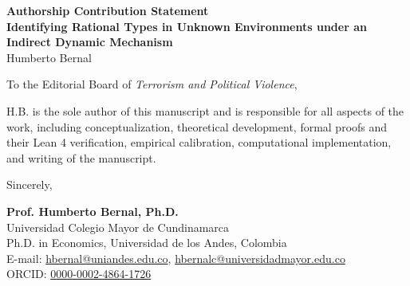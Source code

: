 \documentclass[12pt]{article}
\begin{document}
\singlespacing

\begin{center}
\textbf{Authorship Contribution Statement} \\
\vspace{1em}
\textbf{Identifying Rational Types in Unknown Environments under an Indirect Dynamic Mechanism} \\
Humberto Bernal
\end{center}

\vspace{3em}

\noindent To the Editorial Board of \textit{Terrorism and Political Violence},

\vspace{2em}

\noindent H.B. is the sole author of this manuscript and is responsible for all aspects of the work, including conceptualization, theoretical development, formal proofs and their Lean 4 verification, empirical calibration, computational implementation, and writing of the manuscript.

\vspace{4em}

\begin{flushleft}
Sincerely,

\vspace{3em}

\textbf{Prof. Humberto Bernal, Ph.D.} \\
Universidad Colegio Mayor de Cundinamarca \\
Ph.D. in Economics, Universidad de los Andes, Colombia \\
E-mail: \href{mailto:hbernal@uniandes.edu.co}{hbernal@uniandes.edu.co}, \href{mailto:hbernalc@universidadmayor.edu.co}{hbernalc@universidadmayor.edu.co} \\
ORCID: \href{https://orcid.org/0000-0002-4864-1726}{0000-0002-4864-1726}
\end{flushleft}
\end{document}
